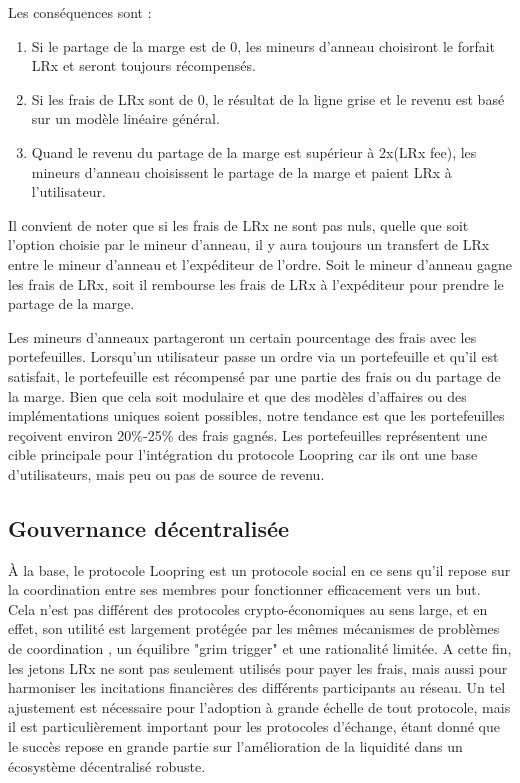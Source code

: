 \documentclass[UTF8,nofonts]{article}
\begin{document}
\begin{multicols}{2}
Les conséquences sont :  
\begin{enumerate}
	\item Si le partage de la marge est de 0, les mineurs d’anneau choisiront le forfait LRx et seront toujours récompensés.
	\item Si les frais de LRx sont de 0, le résultat de la ligne grise et le revenu est basé sur un modèle linéaire général.
	\item Quand le revenu du partage de la marge est supérieur à 2x(LRx fee), les mineurs d’anneau choisissent le partage de la marge et paient LRx à l'utilisateur.

\end{enumerate}

Il convient de noter que si les frais de LRx ne sont pas nuls, quelle que soit l'option choisie par le mineur d’anneau, il y aura toujours un transfert de LRx entre le mineur d’anneau et l'expéditeur de l'ordre. Soit le mineur d’anneau gagne les frais de LRx, soit il rembourse les frais de LRx à l'expéditeur pour prendre le partage de la marge.

Les mineurs d'anneaux partageront un certain pourcentage des frais avec les portefeuilles. Lorsqu'un utilisateur passe un ordre via un portefeuille et qu'il est satisfait, le portefeuille est récompensé par une partie des frais ou du partage de la marge. Bien que cela soit modulaire et que des modèles d'affaires ou des implémentations uniques soient possibles, notre tendance est que les portefeuilles reçoivent environ 20\%-25\% des frais  gagnés. Les portefeuilles représentent une cible principale pour l'intégration du protocole Loopring car ils ont une base d'utilisateurs, mais peu ou pas de source de revenu.

\subsection{Gouvernance décentralisée}
À la base, le protocole Loopring est un protocole social en ce sens qu'il repose sur la coordination entre ses membres pour fonctionner efficacement vers un but. Cela n'est pas différent des protocoles crypto-économiques au sens large, et en effet, son utilité est largement protégée par les mêmes mécanismes de problèmes de coordination \cite{vitalikgovernance}, un équilibre "grim trigger" et une rationalité limitée. A cette fin, les jetons LRx ne sont pas seulement utilisés pour payer les frais, mais aussi pour harmoniser les incitations financières des différents participants au réseau. Un tel ajustement est nécessaire pour l'adoption à grande échelle de tout protocole, mais il est particulièrement important pour les protocoles d'échange, étant donné que le succès repose en grande partie sur l'amélioration de la liquidité dans un écosystème décentralisé robuste.


\end{multicols}
\end{document}
